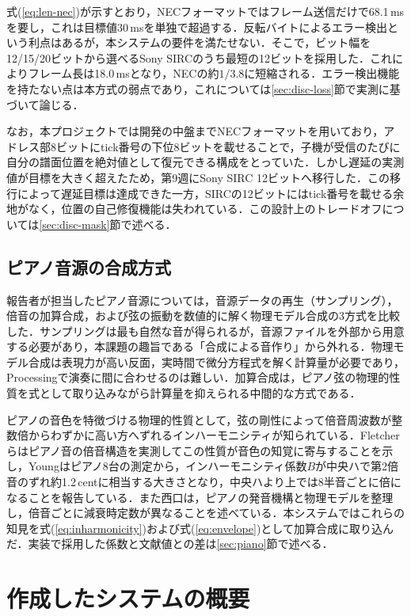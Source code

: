 \documentclass[uplatex,dvipdfmx]{jlreq}
\begin{document}
式(\ref{eq:len-nec})が示すとおり，NECフォーマットではフレーム送信だけで68.1\,msを要し，これは目標値30\,msを単独で超過する．反転バイトによるエラー検出という利点はあるが，本システムの要件を満たせない．そこで，ビット幅を12/15/20ビットから選べるSony SIRCのうち最短の12ビットを採用した．これによりフレーム長は18.0\,msとなり，NECの約$1/3.8$に短縮される．エラー検出機能を持たない点は本方式の弱点であり，これについては\ref{sec:disc-loss}節で実測に基づいて論じる．

なお，本プロジェクトでは開発の中盤までNECフォーマットを用いており，アドレス部8ビットにtick番号の下位8ビットを載せることで，子機が受信のたびに自分の譜面位置を絶対値として復元できる構成をとっていた．しかし遅延の実測値が目標を大きく超えたため，第9週にSony SIRC 12ビットへ移行した．この移行によって遅延目標は達成できた一方，SIRCの12ビットにはtick番号を載せる余地がなく，位置の自己修復機能は失われている．この設計上のトレードオフについては\ref{sec:disc-mask}節で述べる．

\subsection{ピアノ音源の合成方式}
\label{sec:piano-compare}

報告者が担当したピアノ音源については，音源データの再生（サンプリング），倍音の加算合成，および弦の振動を数値的に解く物理モデル合成の3方式を比較した．サンプリングは最も自然な音が得られるが，音源ファイルを外部から用意する必要があり，本課題の趣旨である「合成による音作り」から外れる．物理モデル合成は表現力が高い反面，実時間で微分方程式を解く計算量が必要であり，Processingで演奏に間に合わせるのは難しい．加算合成は，ピアノ弦の物理的性質を式として取り込みながら計算量を抑えられる中間的な方式である．

ピアノの音色を特徴づける物理的性質として，弦の剛性によって倍音周波数が整数倍からわずかに高い方へずれるインハーモニシティが知られている．Fletcherらはピアノ音の倍音構造を実測してこの性質が音色の知覚に寄与することを示し\cite{fletcher}，Youngはピアノ8台の測定から，インハーモニシティ係数$B$が中央ハで第2倍音のずれ約1.2\,centに相当する大きさとなり，中央ハより上では8半音ごとに倍になることを報告している\cite{young1952}．また西口は，ピアノの発音機構と物理モデルを整理し，倍音ごとに減衰時定数が異なることを述べている\cite{nishiguchi}．本システムではこれらの知見を式(\ref{eq:inharmonicity})および式(\ref{eq:envelope})として加算合成に取り込んだ．実装で採用した係数と文献値との差は\ref{sec:piano}節で述べる．

\section{作成したシステムの概要}
\label{sec:overview}
\end{document}
